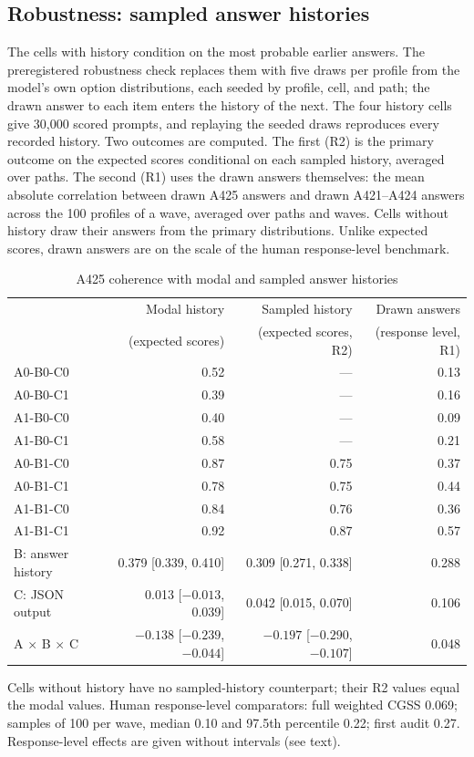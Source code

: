 \documentclass[11pt]{article}
\begin{document}
\subsection{Robustness: sampled answer histories}
\label{sec:robust}

The cells with history condition on the most probable earlier answers. The preregistered robustness check replaces them with five draws per profile from the model's own option distributions, each seeded by profile, cell, and path; the drawn answer to each item enters the history of the next. The four history cells give 30,000 scored prompts, and replaying the seeded draws reproduces every recorded history. Two outcomes are computed. The first (R2) is the primary outcome on the expected scores conditional on each sampled history, averaged over paths. The second (R1) uses the drawn answers themselves: the mean absolute correlation between drawn A425 answers and drawn A421--A424 answers across the 100 profiles of a wave, averaged over paths and waves. Cells without history draw their answers from the primary distributions. Unlike expected scores, drawn answers are on the scale of the human response-level benchmark.

\begin{table}[H]
\centering
\caption{A425 coherence with modal and sampled answer histories}
\label{tab:robust}
\small
\begin{tabular}{lrrr}
\toprule
 & Modal history & Sampled history & Drawn answers \\
 & (expected scores) & (expected scores, R2) & (response level, R1) \\
\midrule
A0-B0-C0 & 0.52 & --- & 0.13 \\
A0-B0-C1 & 0.39 & --- & 0.16 \\
A1-B0-C0 & 0.40 & --- & 0.09 \\
A1-B0-C1 & 0.58 & --- & 0.21 \\
A0-B1-C0 & 0.87 & 0.75 & 0.37 \\
A0-B1-C1 & 0.78 & 0.75 & 0.44 \\
A1-B1-C0 & 0.84 & 0.76 & 0.36 \\
A1-B1-C1 & 0.92 & 0.87 & 0.57 \\
\midrule
B: answer history & 0.379 [0.339, 0.410] & 0.309 [0.271, 0.338] & 0.288 \\
C: JSON output & 0.013 [$-0.013$, 0.039] & 0.042 [0.015, 0.070] & 0.106 \\
A $\times$ B $\times$ C & $-0.138$ [$-0.239$, $-0.044$] & $-0.197$ [$-0.290$, $-0.107$] & 0.048 \\
\bottomrule
\end{tabular}
\begin{tablenotes}\footnotesize
\item Cells without history have no sampled-history counterpart; their R2 values equal the modal values. Human response-level comparators: full weighted CGSS 0.069; samples of 100 per wave, median 0.10 and 97.5th percentile 0.22; first audit 0.27. Response-level effects are given without intervals (see text).
\end{tablenotes}
\end{table}
\end{document}
